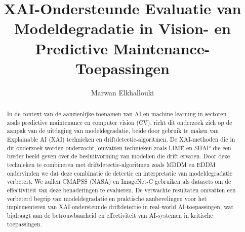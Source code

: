 \documentclass{hogent-article}
\title{XAI-Ondersteunde Evaluatie van Modeldegradatie in Vision- en Predictive Maintenance-Toepassingen}
\author{Marwan Elkhallouki}
\begin{document}
\begin{abstract}
  In de context van de aanzienlijke toenamen van AI en machine learning in sectoren zoals predictive maintenance en computer vision (CV), richt dit onderzoek zich op de aanpak van de uitdaging van modeldegradatie, beide door gebruik te maken van Explainable AI (XAI) technieken en driftdetectie-algoritmen. De XAI-methoden die in dit onderzoek worden onderzocht, omvatten technieken zoals LIME \autocite{garreau2020explaining} en SHAP \autocite{VandenBroeck2022} die een breder beeld geven over de besluitvorming van modellen die drift ervaren. Door deze technieken te combineren met driftdetectie-algoritmen zoals MDDM \autocite{Pesaranghader2017} en EDDM \autocite{baena2006early} ondervinden we dat deze combinatie de detectie en interpretatie van modeldegradatie verbetert. We zullen CMAPSS (NASA) \autocite{Saxena2008} en ImageNet-C \autocite{Hendrycks2019} gebruiken als datasets om de effectiviteit van deze benaderingen te evalueren. De verwachte resultaten omvatten een verbeterd begrip van modeldegradatie en praktische aanbevelingen voor het implementeren van XAI-ondersteunde driftdetectie in real-world AI-toepassingen, wat bijdraagt aan de betrouwbaarheid en effectiviteit van AI-systemen in kritische toepassingen.

\end{abstract}

\tableofcontents



\printbibliography[heading=bibintoc]
\end{document}
